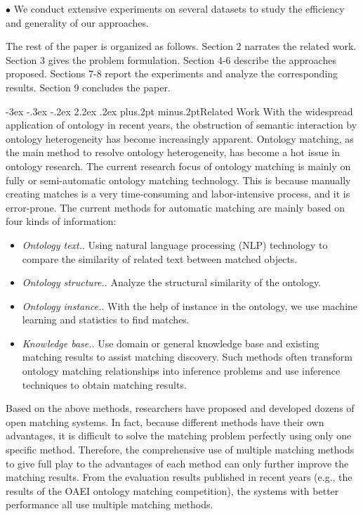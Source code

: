 \documentclass[twoside]{article}
\makeatletter
\def\section{\@startsection{section}{1}{\z@}%
 {-3ex \@plus -.3ex \@minus -.2ex}%
 {2.2ex \@plus.2ex}%
{\normalfont\normalsize\protect\baselineskip=14.5pt plus.2pt minus.2pt\bfseries}}
\makeatother
\begin{document}
\begin{multicols}{2}
$\bullet$ We conduct extensive experiments on several datasets to study the efficiency and generality of our approaches.


The rest of the paper is organized as follows. Section 2 narrates the related work. Section 3 gives the problem formulation. Section 4-6 describe the approaches proposed. Sections 7-8 report the experiments and analyze the corresponding results. Section 9 concludes the paper.

\section{Related Work}
With the widespread application of ontology in recent years, the obstruction of semantic interaction by ontology heterogeneity has become increasingly apparent. Ontology matching, as the main method to resolve ontology heterogeneity, has become a hot issue in ontology research\cite{wwy14,wwy15,wwy16,wwy17,wwy18,wwy19}. The current research focus of ontology matching is mainly on fully or semi-automatic ontology matching technology. This is because manually creating matches is a very time-consuming and labor-intensive process, and it is error-prone\cite{wwy20}. The current methods for automatic matching are mainly based on four kinds of information\cite{wwy21,wwy22}:
\begin {itemize}
\item {\it Ontology text.}\cite{wwy23,wwy24}. Using natural language processing (NLP) technology to compare the similarity of related text between matched objects.
\item {\it Ontology structure.}\cite{wwy25,wwy26}. Analyze the structural similarity of the ontology.
\item {\it  Ontology instance.}\cite{wwy27,wwy28}. With the help of instance in the ontology, we use machine learning and statistics to find matches.
\item {\it Knowledge base.}\cite{wwy29,wwy30}. Use domain or general knowledge base and existing matching results to assist matching discovery. Such methods often transform ontology matching relationships into inference problems and use inference techniques to obtain matching results.
\end {itemize}

Based on the above methods, researchers have proposed and developed dozens of open matching systems. In fact, because different methods have their own advantages, it is difficult to solve the matching problem perfectly using only one specific method. Therefore, the comprehensive use of multiple matching methods to give full play to the advantages of each method can only further improve the matching results. From the evaluation results published in recent years (e.g., the results of the OAEI ontology matching competition), the systems with better performance all use multiple matching methods\cite{wwy31,wwy32,wwy33,wwy34}.


\end{multicols}
\end{document}
